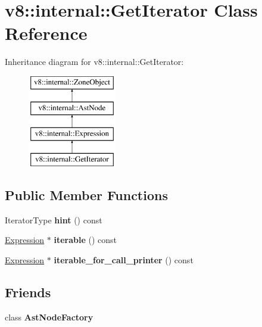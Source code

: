 \hypertarget{classv8_1_1internal_1_1GetIterator}{}\section{v8\+:\+:internal\+:\+:Get\+Iterator Class Reference}
\label{classv8_1_1internal_1_1GetIterator}
Inheritance diagram for v8\+:\+:internal\+:\+:Get\+Iterator\+:\begin{figure}[H]
\begin{center}
\leavevmode
\includegraphics[height=4.000000cm]{classv8_1_1internal_1_1GetIterator}
\end{center}
\end{figure}
\subsection*{Public Member Functions}
\begin{DoxyCompactItemize}
\item 
\mbox{\label{classv8_1_1internal_1_1GetIterator_a2dcdbb4873c916c4f7c4943148418ae6}} 
Iterator\+Type {\bfseries hint} () const
\item 
\mbox{\label{classv8_1_1internal_1_1GetIterator_a069f6a7fe0d97aa1e01c45e490c25af9}} 
\mbox{\hyperlink{classv8_1_1internal_1_1Expression}{Expression}} $\ast$ {\bfseries iterable} () const
\item 
\mbox{\label{classv8_1_1internal_1_1GetIterator_a4baec2a41d2f7842fec6e908b64533d8}} 
\mbox{\hyperlink{classv8_1_1internal_1_1Expression}{Expression}} $\ast$ {\bfseries iterable\+\_\+for\+\_\+call\+\_\+printer} () const
\end{DoxyCompactItemize}
\subsection*{Friends}
\begin{DoxyCompactItemize}
\item 
\mbox{\label{classv8_1_1internal_1_1GetIterator_a8d587c8ad3515ff6433eb83c578e795f}} 
class {\bfseries Ast\+Node\+Factory}
\end{DoxyCompactItemize}
